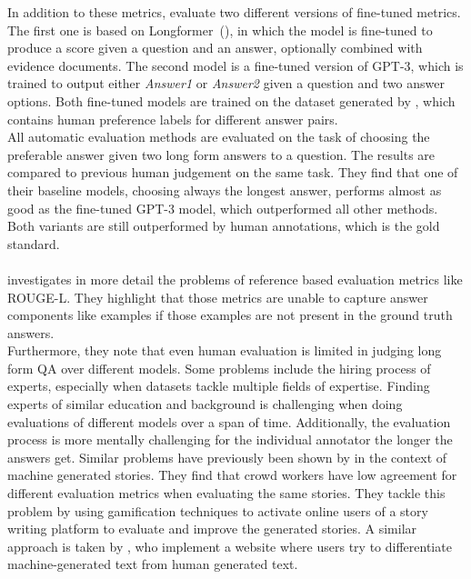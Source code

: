 In addition to these metrics, \cite{xu:2023:A} evaluate two different versions of fine-tuned metrics.
The first one is based on Longformer~(\cite{beltagy:2020:Longformer}), in which the model is fine-tuned to produce a score given a question and an answer, optionally combined with evidence documents.
The second model is a fine-tuned version of GPT-3, which is trained to output either \emph{Answer1} or \emph{Answer2} given a question and two answer options.
Both fine-tuned models are trained on the dataset generated by \cite{nakano:2021:Webgpt}, which contains human preference labels for different answer pairs.
\\
All automatic evaluation methods are evaluated on the task of choosing the preferable answer given two long form answers to a question.
The results are compared to previous human judgement on the same task.
They find that one of their baseline models, choosing always the longest answer, performs almost as good as the fine-tuned GPT-3 model, which outperformed all other methods.
Both variants are still outperformed by human annotations, which is the gold standard.
\\\\
\cite{krishna:2021:Hurdles} investigates in more detail the problems of reference based evaluation metrics like ROUGE-L. 
They highlight that those metrics are unable to capture answer components like examples if those examples are not present in the ground truth answers. 
\\
Furthermore, they note that even human evaluation is limited in judging long form QA over different models.
Some problems include the hiring process of experts, especially when datasets tackle multiple fields of expertise.
Finding experts of similar education and background is challenging when doing evaluations of different models over a span of time.
Additionally, the evaluation process is more mentally challenging for the individual annotator the longer the answers get.
Similar problems have previously been shown by \cite{akoury:2020:Storium} in the context of machine generated stories.
They find that crowd workers have low agreement for different evaluation metrics when evaluating the same stories.
They tackle this problem by using gamification techniques to activate online users of a story writing platform to evaluate and improve the generated stories.
A similar approach is taken by \cite{dugan:2020:RoFT}, who implement a website where users try to differentiate machine-generated text from human generated text.
\\\\
